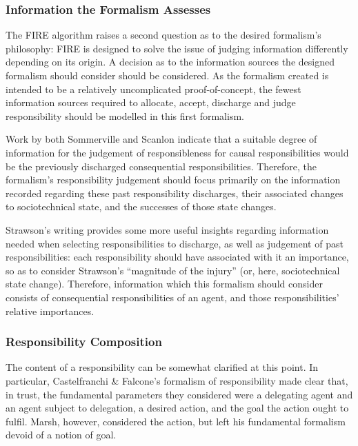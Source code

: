 \subsubsection{Information the Formalism Assesses}
The FIRE algorithm raises a second question as to the desired formalism's philosophy: FIRE is designed to solve the issue of judging information differently depending on its origin. A decision as to the information sources the designed formalism should consider should be considered. As the formalism created is intended to be a relatively uncomplicated proof-of-concept, the fewest information sources required to allocate, accept, discharge and judge responsibility should be modelled in this first formalism.\par

Work by both Sommerville and Scanlon indicate that a suitable degree of information for the judgement of responsibleness for causal responsibilities would be the previously discharged consequential responsibilities. Therefore, the formalism's responsibility judgement should focus primarily on the information recorded regarding these past responsibility discharges, their associated changes to sociotechnical state, and the successes of those state changes.\par

Strawson's writing provides some more useful insights regarding information needed when selecting responsibilities to discharge, as well as judgement of past responsibilities: each responsibility should have associated with it an importance, so as to consider Strawson's ``magnitude of the injury'' (or, here, sociotechnical state change). Therefore, information which this formalism should consider consists of consequential responsibilities of an agent, and those responsibilities' relative importances.\par

\subsubsection{Responsibility Composition}
The content of a responsibility can be somewhat clarified at this point. In particular, Castelfranchi \& Falcone's formalism of responsibility made clear that, in trust, the fundamental parameters they considered were a delegating agent and an agent subject to delegation, a desired action, and the goal the action ought to fulfil. Marsh, however, considered the action, but left his fundamental formalism devoid of a notion of goal.\par

